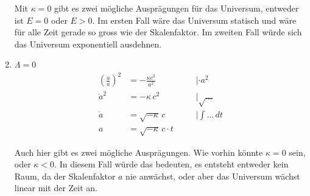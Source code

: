 \begin{refsection}
\begin{enumerate}
	
Mit $\kappa = 0$ gibt es zwei mögliche Ausprägungen für das Universum, entweder ist $E = 0$ oder $E > 0$. Im ersten Fall wäre das Universum statisch und wäre für alle Zeit gerade so gross wie der Skalenfaktor. Im zweiten Fall würde sich das Universum exponentiell ausdehnen.


		
	\item $\Lambda = 0$ 
		\begin{align}
			\nonumber \left(\frac{\dot{a}}{a}\right) ^2 &= - \frac{\kappa c^2}{a^2}  \qquad &&| \cdot a^2\\
			\nonumber \dot{a} ^2 &= - \kappa \, c^2 \qquad &&|\sqrt{...}\\
			\nonumber \dot{a} &= \sqrt{- \kappa}\, c \qquad &&|\int ...\, dt \\
			a &= \sqrt{- \kappa}\, c \cdot t \label{friedmann:Kappa}
		\end{align}
		
Auch hier gibt es zwei mögliche Ausprägungen. Wie vorhin könnte $\kappa = 0$ sein, oder $\kappa < 0$. In diesem Fall würde das bedeuten, es entsteht entweder kein Raum, da der Skalenfaktor $a$ nie anwächst, oder aber das Universum wächst linear mit der Zeit an.
	
\end{enumerate}


\end{refsection}

